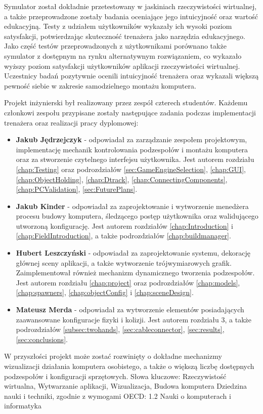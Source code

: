 Symulator został dokładnie przetestowany w jaskiniach rzeczywistości wirtualnej, a także przeprowadzone zostały badania oceniające jego intuicyjność oraz wartość edukacyjną.
Testy z udziałem użytkowników wykazały ich wysoki poziom satysfakcji, potwierdzając skuteczność trenażera jako narzędzia edukacyjnego.
Jako część testów przeprowadzonych z użytkownikami porównano także symulator z dostępnym na rynku alternatywnym rozwiązaniem, co wykazało wyższy poziom satysfakcji użytkowników aplikacji rzeczywistości wirtualnej.
Uczestnicy badań pozytywnie ocenili intuicyjność trenażera oraz wykazali większą pewność siebie w zakresie samodzielnego montażu komputera.

Projekt inżynierski był realizowany przez zespół czterech studentów.
Każdemu członkowi zespołu przypisane zostały następujące zadania podczas implementacji trenażera oraz realizacji pracy dyplomowej:
\begin{itemize}
    \item \textbf{Jakub Jędrzejczyk} - odpowiadał za zarządzanie zespołem projektowym, implementację mechanik kontrolowania podzespołów i montażu komputera oraz za stworzenie czytelnego interfejsu użytkownika. Jest autorem rozdziału \ref{chap:Testing} oraz podrozdziałów \ref{sec:GameEngineSelection}, \ref{chap:GUI}, \ref{chap:ObjectHolding}, \ref{chap:Dtrack}, \ref{chap:ConnectingComponents}, \ref{chap:PCValidation}, \ref{sec:FuturePlans}.
    \item \textbf{Jakub Kinder} - odpowiadał za zaprojektowanie i wytworzenie menedżera procesu budowy komputera, śledzącego postęp użytkownika oraz walidującego utworzoną konfigurację. Jest autorem rozdziałów \ref{chap:Introduction} i \ref{chap:FieldIntroduction}, a także podrozdziałów \ref{chap:buildmanager}. 
    \item \textbf{Hubert Leszczyński} - odpowiadał za zaprojektowanie systemu, dekorację głównej sceny aplikacji, a także wytworzenie trójwymiarowych grafik. Zaimplementował również mechanizm dynamicznego tworzenia podzespołów. Jest autorem rozdziału \ref{chap:project} oraz podrozdziałów \ref{chap:models}, \ref{chap:spawners}, \ref{chap:objectConfig} i \ref{chap:sceneDesign}.
    \item \textbf{Mateusz Merda} - odpowiadał za wytworzenie elementów posiadających zaawansowane konfiguracje fizyki i kolizji. Jest autorem rozdziału 3, a także podrozdziałów \ref{subsec:twohands}, \ref{sec:cableconnector}, \ref{sec:results}, \ref{sec:conclusions}.
\end{itemize}

W przyszłości projekt może zostać rozwinięty o dokładne mechanizmy wizualizacji działania komputera osobistego, a także o większą liczbę dostępnych podzespołów i konfiguracji sprzętowych.
Słowa kluczowe: Rzeczywistość wirtualna, Wytwarzanie aplikacji, Wizualizacja, Budowa komputera
Dziedzina nauki i techniki, zgodnie z wymogami OECD: 1.2 Nauki o komputerach i informatyka